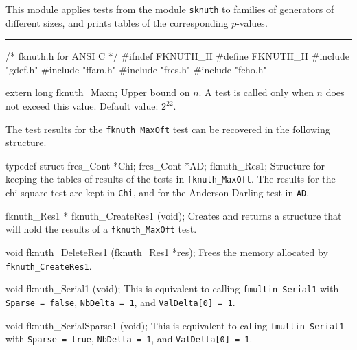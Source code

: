 
This module applies tests from the module {\tt sknuth}
to families of generators of different sizes,
and prints tables of the corresponding $p$-values.


\bigskip
\hrule
\code\hide
/* fknuth.h for ANSI C */
#ifndef FKNUTH_H
#define FKNUTH_H
\endhide
#include "gdef.h"
#include "ffam.h"
#include "fres.h"
#include "fcho.h"


extern long fknuth_Maxn;
\endcode
\tab
  Upper bound on $n$.
  A test is called only when $n$ does not exceed this value.
  Default value: $2^{22}$.
\endtab
\ifdetailed  %



The test results for the {\tt fknuth\_MaxOft} test can be recovered
in the following structure.

\code

typedef struct {
   fres_Cont *Chi;
   fres_Cont *AD;
} fknuth_Res1;
\endcode
 \tab
  Structure for keeping the tables of results of the tests in
  {\tt fknuth\_MaxOft}. The results for the chi-square test are kept in
  {\tt Chi}, and for the Anderson-Darling test in  {\tt AD}.
 \endtab
\code


fknuth_Res1 * fknuth_CreateRes1 (void);
\endcode
 \tab
  Creates and returns a structure that will hold the results
  of a  {\tt fknuth\_MaxOft} test.
 \endtab
\code


void fknuth_DeleteRes1 (fknuth_Res1 *res);
\endcode
 \tab
  Frees the memory allocated by {\tt fknuth\_CreateRes1}.
 \endtab

\fi    %


\code

void fknuth_Serial1 (void);
\endcode
\tab This is equivalent to calling
 {\tt fmultin\_Serial1} with {\tt Sparse = false},
  {\tt NbDelta = 1}, and {\tt Val\-Delta[0] = 1}.
 \endtab
\code


void fknuth_SerialSparse1 (void);
\endcode
\tab This is equivalent to calling {\tt fmultin\_Serial1} with
  {\tt Sparse = true},  {\tt NbDelta = 1}, and {\tt Val\-Delta[0] = 1}.
 \endtab
\code


